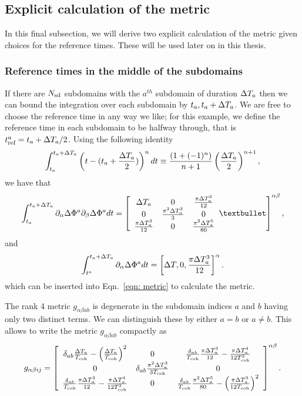 \documentclass[../full_thesis/full_thesis.tex]{subfiles}
\begin{document}
\subsection{Explicit calculation of the metric}
In this final subsection, we will derive two explicit calculation of the metric
given choices for the reference times. These will be used later on in this
thesis.
\subsubsection{Reference times in the middle of the subdomains}
If there are $N_{\textrm{sd}}$
subdomains with the $a^{th}$ subdomain of duration $\Delta T_a$ then we can bound the
integration over each subdomain by $t_{a}, t_{a} + \Delta T_a$. We are free to choose
the reference time
in any way we like; for this example, we define the reference time in each subdomain
to be halfway through, that is $t_{\textrm{ref}}^{a} = t_{a} + \Delta T_a/2$. Using the following identity
\begin{align}
\int_{t_{a}}^{t_{a}+\Delta T_a} \left(t - (t_{a} + \frac{\Delta T_a}{2})\right)^{n}
dt \equiv  \frac{\left(1
+(-1)^{n}\right)}{n+1}\left(\frac{\Delta T_a}{2}\right)^{n+1},
\end{align}
we have that
\begin{equation}
\int_{t_{a}}^{t_{a}+\dT_a} \partial_{\alpha}\Delta \Phi^{a}  \partial_{\beta}\Delta \Phi^{a} dt =  \left[\begin{array}{ccc}
\dT_a  & 0 &  \frac{\pi \dT_a^{3}}{12}\\
0 & \frac{\pi^{2}\dT_a^{3}}{3} &  0\\
\frac{\pi \dT_a^{3}}{12} & 0  &  \frac{\pi^{2}\dT_a^{5}}{80}\\
\end{array}•
\right]^{\alpha\beta},
\end{equation}
and
\begin{equation}
\int_{t^{a}}^{t_{a}+\Delta T_a} \partial_{\alpha}\Delta \Phi^{a}  dt =
 \left[\Delta T, 0 , \frac{\pi \Delta T_a^{3}}{12} \right]^{\alpha}.
\end{equation}
which can be inserted into Eqn.~\eqref{eqn: metric} to calculate the metric.

The rank 4 metric $g_{\alpha\beta a b}$ is degenerate in the subdomain indices
$a$ and $b$ having only two distinct terms. We can distinguish these by either
$a=b$ or $a\ne b$. This allows to write the metric $g_{\alpha \beta a b}$
compactly as
\begin{align}
g_{\alpha\beta ij} = \left[\begin{array}{ccc}
\delta_{ab}\frac{\Delta T_a}{T_{\mathrm{coh}}} -\left(\frac{\Delta T_a}{T_{\mathrm{coh}}}\right)^{2}
& 0
& \frac{\delta_{ab}}{T_{\mathrm{coh}}}\frac{\pi \Delta T_a^{3}}{12} - \frac{\pi \Delta T_a^{4}}{12T_{\mathrm{coh}}^{2}}\\
0
& \delta_{ab}\frac{\pi^{2}\Delta T_a^{3}}{3T_{\mathrm{coh}}}
&  0\\
\frac{\delta_{ab}}{T_{\mathrm{coh}}}\frac{\pi \Delta T_a^{3}}{12} - \frac{\pi \Delta T_a^{4}}{12T_{\mathrm{coh}}^{2}}
& 0
&  \frac{\delta_{ab}}{T_{\mathrm{coh}}}\frac{\pi^{2}\Delta T_a^{5}}{80} -  \left(\frac{\pi \Delta T_a^{3}}{12 T_{\mathrm{coh}}}\right)^{2} \\
\end{array}
\right]^{\alpha\beta}.
\label{eqn: metric tref half}
\end{align}
\end{document}

